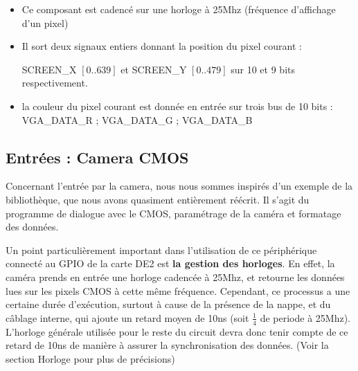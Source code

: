 \documentclass[10pt,a4paper]{report}
\begin{document}
\begin{itemize}
\item Ce composant est cadencé sur une horloge à 25Mhz (fréquence d'affichage d'un pixel)
\item Il sort deux signaux entiers donnant la position du pixel courant :

SCREEN\_X $\left[ 0 .. 639 \right]$ et SCREEN\_Y $\left[ 0 .. 479 \right]$ sur 10 et 9 bits respectivement.
\item la couleur du pixel courant est donnée en entrée sur trois bus de 10 bits : VGA\_DATA\_R ; VGA\_DATA\_G ; VGA\_DATA\_B
\end{itemize}

\subsection{Entrées : Camera CMOS}
Concernant l'entrée par la camera, nous nous sommes inspirés d'un exemple de la bibliothèque, que nous avons quasiment entièrement réécrit. Il s'agit du programme de dialogue avec le CMOS, paramétrage de la caméra et formatage des données.

Un point particulièrement important dans l'utilisation de ce périphérique connecté au GPIO de la carte DE2 est \textbf{la gestion des horloges}. En effet, la caméra prends en entrée une horloge cadencée à 25Mhz, et retourne les données lues sur les pixels CMOS à cette même fréquence. Cependant, ce processus a une certaine durée d'exécution, surtout à cause de la présence de la nappe, et du câblage interne, qui ajoute un retard moyen de 10ns (soit $\frac{1}{4}$ de periode à 25Mhz). L'horloge générale utilisée pour le reste du circuit devra donc tenir compte de ce retard de 10ns de manière à assurer la synchronisation des données. (Voir la section Horloge pour plus de précisions)
\end{document}
